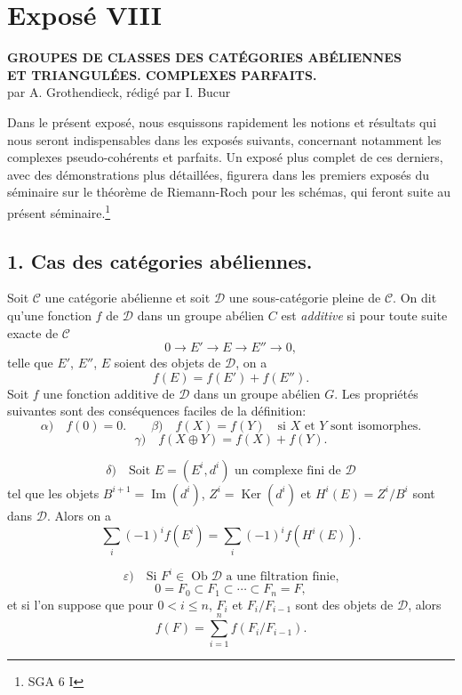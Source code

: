 \documentclass[11pt]{article}
\providecommand{\Ob}{\operatorname{ob}}
\providecommand{\cC}{\mathcal C}
\providecommand{\Ob}{\operatorname{ob}}
\providecommand{\cC}{\mathcal C}
\providecommand{\cD}{\mathcal D}
\providecommand{\Ob}{\operatorname{Ob}}
\providecommand{\Ob}{\operatorname{ob}}
\providecommand{\Ob}{\operatorname{Ob}}
\begin{document}
\newpage
\section*{Exposé VIII}
\renewcommand{\Ob}{\operatorname{Ob}}

\begin{center}
\textbf{GROUPES DE CLASSES DES CATÉGORIES ABÉLIENNES}\\
\textbf{ET TRIANGULÉES. COMPLEXES PARFAITS.}\\[1ex]
par A. Grothendieck, rédigé par I. Bucur
\end{center}

Dans le présent exposé, nous esquissons rapidement les notions et résultats qui nous seront indispensables dans les exposés suivants, concernant notamment les complexes pseudo-cohérents et parfaits. Un exposé plus complet de ces derniers, avec des démonstrations plus détaillées, figurera dans les premiers exposés du séminaire sur le théorème de Riemann-Roch pour les schémas, qui feront suite au présent séminaire.\footnote{SGA 6 I}

\subsection*{1. Cas des catégories abéliennes.}

Soit $\cC$ une catégorie abélienne et soit $\cD$ une sous-catégorie pleine de $\cC$. On dit qu'une fonction $f$ de $\cD$ dans un groupe abélien $C$ est \emph{additive} si pour toute suite exacte de $\cC$
\[
0\longrightarrow E'\longrightarrow E\longrightarrow E''\longrightarrow 0,
\]
telle que $E'$, $E''$, $E$ soient des objets de $\cD$, on a
\[
f(E)=f(E')+f(E'').
\]
Soit $f$ une fonction additive de $\cD$ dans un groupe abélien $G$. Les propriétés suivantes sont des conséquences faciles de la définition:
\[
\alpha)\quad f(0)=0.\qquad
\beta)\quad f(X)=f(Y)\quad\text{si }X\text{ et }Y\text{ sont isomorphes.}
\]
\[
\gamma)\quad f(X\oplus Y)=f(X)+f(Y).
\]

\[
\delta)\quad
\text{Soit }E=(E^i,d^i)\text{ un complexe fini de }\cD
\]
tel que les objets $B^{i+1}=\operatorname{Im}(d^i)$, $Z^i=\operatorname{Ker}(d^i)$ et $H^i(E)=Z^i/B^i$ sont dans $\cD$. Alors on a
\[
\sum_i (-1)^i f(E^i)=\sum_i (-1)^i f(H^i(E)).
\]

\[
\varepsilon)\quad
\text{Si }F^i\in\Ob \cD\text{ a une filtration finie,}
\]
\[
0=F_0\subset F_1\subset\cdots\subset F_n=F,
\]
et si l'on suppose que pour $0<i\le n$, $F_i$ et $F_i/F_{i-1}$ sont des objets de $\cD$, alors
\[
f(F)=\sum_{i=1}^n f(F_i/F_{i-1}).
\]
\end{document}
